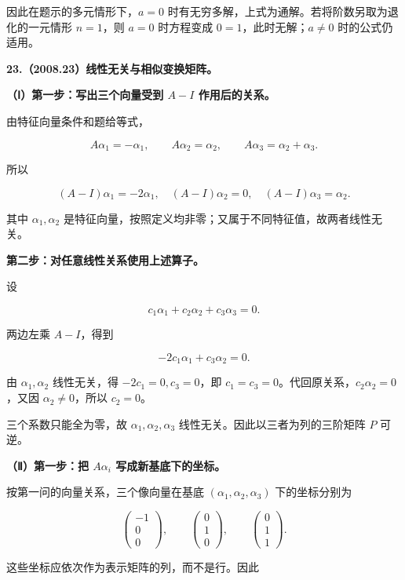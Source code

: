 \documentclass[UTF8,11pt,fontset=windows]{ctexart}
\begin{document}
因此在题示的多元情形下，$a=0$ 时有无穷多解，上式为通解。若将阶数另取为退化的一元情形 $n=1$，则 $a=0$ 时方程变成 $0=1$，此时无解；$a\ne0$ 时的公式仍适用。

\clearpage

\textbf{23.（2008.23）线性无关与相似变换矩阵。}

\textbf{（Ⅰ）第一步：写出三个向量受到 $A-I$ 作用后的关系。}

由特征向量条件和题给等式，

$$
A\alpha_1=-\alpha_1,\qquad
A\alpha_2=\alpha_2,\qquad
A\alpha_3=\alpha_2+\alpha_3.
$$

所以

$$
(A-I)\alpha_1=-2\alpha_1,\quad
(A-I)\alpha_2=0,\quad
(A-I)\alpha_3=\alpha_2.
$$

其中 $\alpha_1,\alpha_2$ 是特征向量，按照定义均非零；又属于不同特征值，故两者线性无关。

\textbf{第二步：对任意线性关系使用上述算子。}

设

$$
c_1\alpha_1+c_2\alpha_2+c_3\alpha_3=0.
$$

两边左乘 $A-I$，得到

$$
-2c_1\alpha_1+c_3\alpha_2=0.
$$

由 $\alpha_1,\alpha_2$ 线性无关，得 $-2c_1=0,c_3=0$，即 $c_1=c_3=0$。代回原关系，$c_2\alpha_2=0$，又因 $\alpha_2\ne0$，所以 $c_2=0$。

三个系数只能全为零，故 $\boxed{\alpha_1,\alpha_2,\alpha_3\text{ 线性无关}}$。因此以三者为列的三阶矩阵 $P$ 可逆。

\textbf{（Ⅱ）第一步：把 $A\alpha_i$ 写成新基底下的坐标。}

按第一问的向量关系，三个像向量在基底 $(\alpha_1,\alpha_2,\alpha_3)$ 下的坐标分别为

$$
\begin{pmatrix}-1\\0\\0\end{pmatrix},\qquad
\begin{pmatrix}0\\1\\0\end{pmatrix},\qquad
\begin{pmatrix}0\\1\\1\end{pmatrix}.
$$

这些坐标应依次作为表示矩阵的列，而不是行。因此
\end{document}
